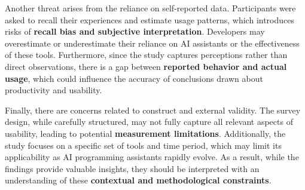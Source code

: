 Another threat arises from the reliance on self-reported data. Participants were asked to recall their experiences and estimate usage patterns, which introduces risks of \textbf{recall bias and subjective interpretation}. Developers may overestimate or underestimate their reliance on AI assistants or the effectiveness of these tools. Furthermore, since the study captures perceptions rather than direct observations, there is a gap between \textbf{reported behavior and actual usage}, which could influence the accuracy of conclusions drawn about productivity and usability.

Finally, there are concerns related to construct and external validity. The survey design, while carefully structured, may not fully capture all relevant aspects of usability, leading to potential \textbf{measurement limitations}. Additionally, the study focuses on a specific set of tools and time period, which may limit its applicability as AI programming assistants rapidly evolve. As a result, while the findings provide valuable insights, they should be interpreted with an understanding of these \textbf{contextual and methodological constraints}.
